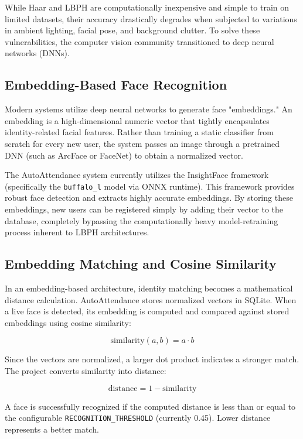 \documentclass[12pt,a4paper]{report}
\newcommand{\JustifiedNormal}{\fontsize{12}{14}\selectfont\justifying\setlength{\parindent}{0pt}}
\begin{document}
While Haar and LBPH are computationally inexpensive and simple to train on limited datasets, their accuracy drastically degrades when subjected to variations in ambient lighting, facial pose, and background clutter. To solve these vulnerabilities, the computer vision community transitioned to deep neural networks (DNNs).

\subsection{Embedding-Based Face Recognition}
\JustifiedNormal
Modern systems utilize deep neural networks to generate face "embeddings." An embedding is a high-dimensional numeric vector that tightly encapsulates identity-related facial features. Rather than training a static classifier from scratch for every new user, the system passes an image through a pretrained DNN (such as ArcFace or FaceNet) to obtain a normalized vector. 

The AutoAttendance system currently utilizes the InsightFace framework (specifically the \texttt{buffalo\_l} model via ONNX runtime). This framework provides robust face detection and extracts highly accurate embeddings. By storing these embeddings, new users can be registered simply by adding their vector to the database, completely bypassing the computationally heavy model-retraining process inherent to LBPH architectures.

\subsection{Embedding Matching and Cosine Similarity}
\JustifiedNormal
In an embedding-based architecture, identity matching becomes a mathematical distance calculation. AutoAttendance stores normalized vectors in SQLite. When a live face is detected, its embedding is computed and compared against stored embeddings using cosine similarity:

\[
\text{similarity}(a,b) = a \cdot b
\]

Since the vectors are normalized, a larger dot product indicates a stronger match. The project converts similarity into distance:

\[
\text{distance} = 1 - \text{similarity}
\]

A face is successfully recognized if the computed distance is less than or equal to the configurable \texttt{RECOGNITION\_THRESHOLD} (currently 0.45). Lower distance represents a better match.
\end{document}
